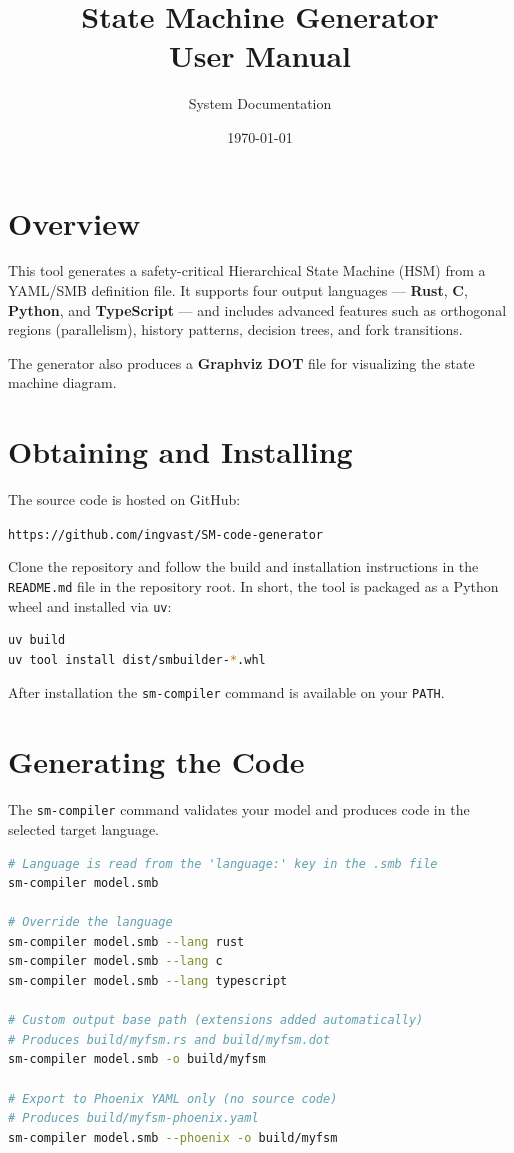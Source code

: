 \documentclass[a4paper,11pt]{article}
\title{\textbf{State Machine Generator \\ User Manual}}
\author{System Documentation}
\date{\today}
\begin{document}
\maketitle
\tableofcontents
\newpage

\section{Overview}
This tool generates a safety-critical Hierarchical State Machine (HSM) from a YAML/SMB definition file. It supports four output languages --- \textbf{Rust}, \textbf{C}, \textbf{Python}, and \textbf{TypeScript} --- and includes advanced features such as orthogonal regions (parallelism), history patterns, decision trees, and fork transitions.

The generator also produces a \textbf{Graphviz DOT} file for visualizing the state machine diagram.

\section{Obtaining and Installing}

The source code is hosted on GitHub:

\begin{center}
\texttt{https://github.com/ingvast/SM-code-generator}
\end{center}

Clone the repository and follow the build and installation instructions in the \texttt{README.md} file in the repository root. In short, the tool is packaged as a Python wheel and installed via \texttt{uv}:

\begin{lstlisting}[language=Bash]
uv build
uv tool install dist/smbuilder-*.whl
\end{lstlisting}

After installation the \texttt{sm-compiler} command is available on your \texttt{PATH}.

\section{Generating the Code}
The \texttt{sm-compiler} command validates your model and produces code in the selected target language.

\begin{lstlisting}[language=Bash, caption=Command Line Usage]
# Language is read from the 'language:' key in the .smb file
sm-compiler model.smb

# Override the language
sm-compiler model.smb --lang rust
sm-compiler model.smb --lang c
sm-compiler model.smb --lang typescript

# Custom output base path (extensions added automatically)
# Produces build/myfsm.rs and build/myfsm.dot
sm-compiler model.smb -o build/myfsm

# Export to Phoenix YAML only (no source code)
# Produces build/myfsm-phoenix.yaml
sm-compiler model.smb --phoenix -o build/myfsm
\end{lstlisting}
\end{document}
